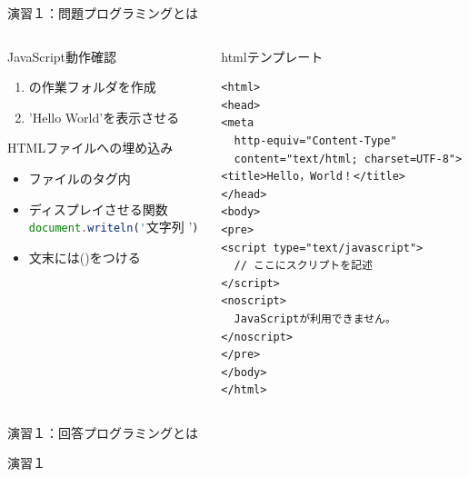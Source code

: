\documentclass[dvipdfmx]{beamer}
\begin{document}
  \begin{frame}[fragile]{演習１：問題}{プログラミングとは}
    \begin{columns}
      \begin{column}{0.55\textwidth}
        \begin{large}JavaScript動作確認\end{large}
        \begin{enumerate}
          \setlength{\itemsep}{3mm}
          \item {}の作業フォルダを作成
          \item {\color{string}'Hello World'}を表示させる
        \end{enumerate}
        \vspace{5mm}
        \begin{large}HTMLファイルへの埋め込み\end{large}
        \begin{itemize}
          \setlength{\itemsep}{3mm}
          \item {}ファイルのタグ内
          \item ディスプレイさせる関数\\
          \lstinline[language=javascript]|document.writeln('|{\color{string}文字列 '}\lstinline[language=javascript]|)|
          \item 文末には()をつける
        \end{itemize}
      \end{column}
      \begin{column}{0.45\textwidth}
        \begin{exampleblock}{htmlテンプレート}
          \begin{lstlisting}[language=html5,basicstyle=\tiny]
<html>
<head>
<meta
  http-equiv="Content-Type"
  content="text/html; charset=UTF-8">
<title>Hello，World！</title>
</head>
<body>
<pre>
<script type="text/javascript">
  // ここにスクリプトを記述
</script>
<noscript>
  JavaScriptが利用できません。
</noscript>
</pre>
</body>
</html>

          \end{lstlisting}
        \end{exampleblock}
      \end{column}
    \end{columns}
  \end{frame}

  \begin{frame}{演習１：回答}{プログラミングとは}
    \begin{exampleblock}{演習１}
      
    \end{exampleblock}
  \end{frame}
\end{document}
